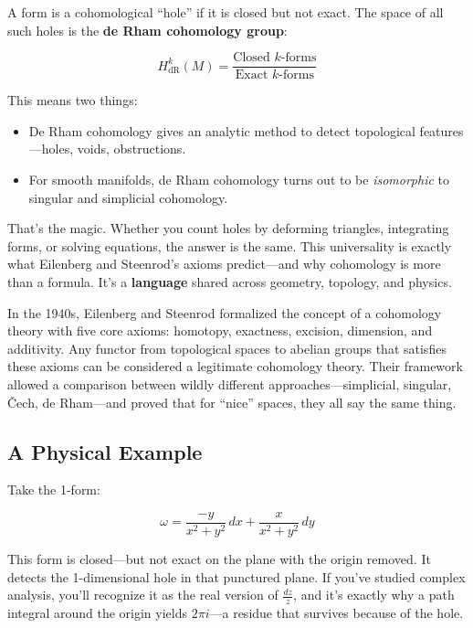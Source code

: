 A form is a cohomological “hole” if it is closed but not exact. The space of all such holes is the \textbf{de Rham cohomology group}:

\[
H^k_{\text{dR}}(M) = \frac{\text{Closed } k\text{-forms}}{\text{Exact } k\text{-forms}}
\]

This means two things:

\begin{itemize}
    \item De Rham cohomology gives an analytic method to detect topological features—holes, voids, obstructions.
    \item For smooth manifolds, de Rham cohomology turns out to be \textit{isomorphic} to singular and simplicial cohomology.
\end{itemize}

That’s the magic. Whether you count holes by deforming triangles, integrating forms, or solving equations, the answer is the same. This universality is exactly what Eilenberg and Steenrod’s axioms predict—and why cohomology is more than a formula. It's a \textbf{language} shared across geometry, topology, and physics.

\begin{tcolorbox}[colback=blue!5!white, colframe=blue!75!black, title={Historical Sidebar: The Axioms of Eilenberg–Steenrod}]
In the 1940s, Eilenberg and Steenrod formalized the concept of a cohomology theory with five core axioms: homotopy, exactness, excision, dimension, and additivity. Any functor from topological spaces to abelian groups that satisfies these axioms can be considered a legitimate cohomology theory. Their framework allowed a comparison between wildly different approaches—simplicial, singular, Čech, de Rham—and proved that for “nice” spaces, they all say the same thing.
\end{tcolorbox}

\subsection{A Physical Example}

Take the 1-form:

\[
\omega = \frac{-y}{x^2 + y^2}\,dx + \frac{x}{x^2 + y^2}\,dy
\]

This form is closed—but not exact on the plane with the origin removed. It detects the 1-dimensional hole in that punctured plane. If you’ve studied complex analysis, you’ll recognize it as the real version of \( \frac{dz}{z} \), and it’s exactly why a path integral around the origin yields \( 2\pi i \)—a residue that survives because of the hole.

